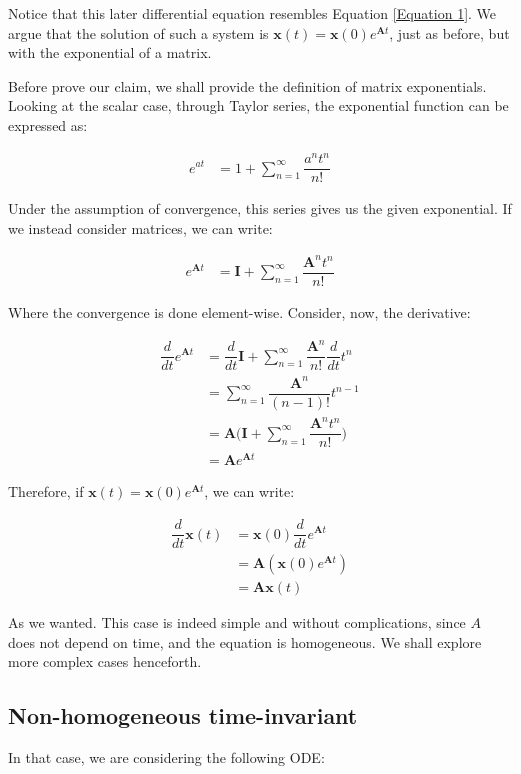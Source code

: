 \documentclass[12pt]{article}
\begin{document}
	Notice that this later differential equation resembles Equation \ref{Equation 1}. We argue that the solution of such a system is $\mathbf{x}(t) = \mathbf{x}(0)e^{\mathbf{A}t}$, just as before, but with the exponential of a matrix. 
	
	Before prove our claim, we shall provide the definition of matrix exponentials. Looking at the scalar case, through Taylor series, the exponential function can be expressed as:
	
	\begin{align}
	e^{at} &= 1 + \sum_{n=1}^{\infty}\dfrac{a^{n}t^{n}}{n!}
	\end{align}
	
	Under the assumption of convergence, this series gives us the given exponential. If we instead consider matrices, we can write:
	
	\begin{align}
	e^{\mathbf{A}t} &= \mathbf{I} + \sum_{n=1}^{\infty}\dfrac{\mathbf{A}^{n}t^{n}}{n!}
	\end{align}
	
	Where the convergence is done element-wise. Consider, now, the derivative:
	
	\begin{align}
	\dfrac{d}{dt}e^{\mathbf{A}t} &= \dfrac{d}{dt}\mathbf{I} + \sum_{n=1}^{\infty}\dfrac{\mathbf{A}^{n}}{n!}\dfrac{d}{dt}t^{n}\\
	&= \sum_{n=1}^{\infty}\dfrac{\mathbf{A}^{n}}{(n-1)!}t^{n-1}\\
	&= \mathbf{A}\biggr(\mathbf{I} + \sum_{n=1}^{\infty}\dfrac{\mathbf{A}^{n}t^{n}}{n!}\biggr)\\
	&= \mathbf{A}e^{\mathbf{A}t}
	\end{align} 
	
	Therefore, if $\mathbf{x}(t) = \mathbf{x}(0)e^{\mathbf{A}t}$, we can write:
	
	\begin{align}
	\dfrac{d}{dt}\mathbf{x}(t) &= \mathbf{x}(0)\dfrac{d}{dt}e^{\mathbf{A}t}\\
	&= \mathbf{A}(\mathbf{x}(0)e^{\mathbf{A}t})\\
	&= \mathbf{A}\mathbf{x}(t)
	\end{align}
	
	As we wanted. This case is indeed simple and without complications, since $A$ does not depend on time, and the equation is homogeneous. We shall explore more complex cases henceforth.
	\subsection{Non-homogeneous time-invariant}
	In that case, we are considering the following ODE:
	
\end{document}
